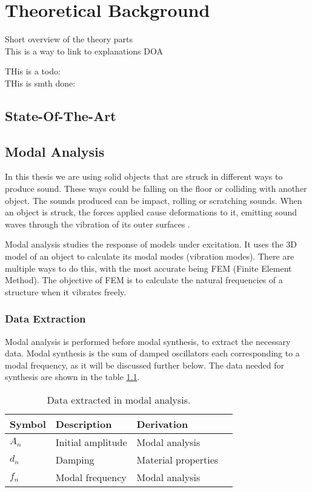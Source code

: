 \chapter{Theoretical Background}\label{ch:theory}
Short overview of the theory parts\\
This is a way to link to explanations \gls{DOA} 

THis is a todo: 
\\
THis is smth done:
\done{}

\section{State-Of-The-Art}\label{sec:state_art}


\section{Modal Analysis}\label{sec:modal_analysis}
In this thesis we are using solid objects that are struck in different ways to produce sound. These ways could be falling on the floor or colliding with another object. The sounds produced can be impact, rolling or scratching sounds. When an object is struck, the forces applied cause deformations to it, emitting sound waves through the vibration of its outer surfaces \cite{van2001foleyautomatic}.

Modal analysis studies the response of models under excitation. It uses the 3D model of an object to calculate its modal modes (vibration modes). There are multiple ways to do this, with the most accurate being FEM (Finite Element Method). The objective of FEM is to calculate the natural frequencies of a structure when it vibrates freely.

\subsection{Data Extraction}\label{sec:data_extract}
Modal analysis is performed before modal synthesis, to extract the necessary data. Modal synthesis is the sum of damped oscillators each corresponding to a modal frequency, as it will be discussed further below. The data needed for synthesis are shown in the table \ref{tab:extracted_data}.

\begin{table}
	\centering
    \begin{tabular}{ | l | l | l | p{5cm} |}
    \hline
    \textbf{Symbol} & \textbf{Description} & \textbf{Derivation} \\ \hline
    $A_n$ & Initial amplitude & Modal analysis \\ \hline
    $d_n$ & Damping & Material properties \\ \hline
    $f_n$ & Modal frequency & Modal analysis \\
    \hline
    \end{tabular}
    \caption{Data extracted in modal analysis.}
    \label{tab:extracted_data}
\end{table} 

